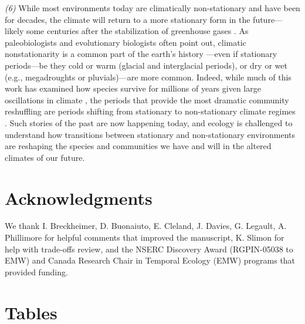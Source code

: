 \documentclass[11pt,letterpaper]{article}
\begin{document}
\emph{(6)}  While most environments today are climatically non-stationary and have been for decades, the climate will return to a more stationary form in the future---likely some centuries after the stabilization of greenhouse gases \citep{ipcc2013ch12}. As paleobiologists and evolutionary biologists often point out, climatic nonstationarity is a common part of the earth's history \citep{Jansson:2002nz}---even if stationary periods---be they cold or warm (glacial and interglacial periods), or dry or wet (e.g., megadroughts or pluvials)---are more common. Indeed, while much of this work has examined how species survive for millions of years given large oscillations in climate \citep{provan2008}, the periods that provide the most dramatic community reshuffling are periods shifting from stationary to non-stationary climate regimes \citep{vrba1980,vrba1985}. Such stories of the past are now happening today, and ecology is challenged to understand how transitions between stationary and non-stationary environments are reshaping the species and communities we have and will in the altered climates of our future.


\section{Acknowledgments}
We thank I. Breckheimer, D. Buonaiuto, E. Cleland, J. Davies, G. Legault, A. Phillimore for helpful comments that improved the manuscript, K. Slimon for help with trade-offs review, and the NSERC Discovery Award (RGPIN-05038 to EMW) and Canada Research Chair in Temporal Ecology (EMW) programs that provided funding. 

\section{Tables}
\end{document}
